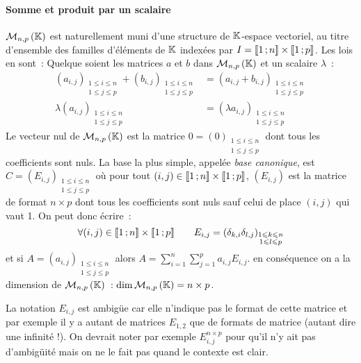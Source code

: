 \paragraph{Somme et produit par un scalaire}
$\mathcal{M}_{n,p}\left(\mathbb{K}\right)$ est naturellement muni d'une structure de $\mathbb{K}$-espace vectoriel, au titre d'ensemble des familles d'éléments de $\mathbb{K}$ indexées par $I = \mathopen{\llbracket}1\mathclose{}\mathpunct{};n\mathclose{\rrbracket} \times \mathopen{\llbracket}1\mathclose{}\mathpunct{};p\mathclose{\rrbracket}$. Les lois en sont~: Quelque soient les matrices $a$ et $b$ dans $\mathcal{M}_{n,p}\left(\mathbb{K}\right)$ et un scalaire $\lambda$~:
\begin{align}
	(a_{i,j})_{\substack{1\leqslant i \leqslant n \\ 1 \leqslant j \leqslant p}} + (b_{i,j})_{\substack{1\leqslant i \leqslant n \\ 1 \leqslant j \leqslant p}} & = (a_{i,j}+b_{i,j})_{\substack{1\leqslant i \leqslant n \\ 1 \leqslant j \leqslant p}} \\
	\lambda  (a_{i,j})_{\substack{1\leqslant i \leqslant n \\ 1 \leqslant j \leqslant p}} &= (\lambda a_{i,j})_{\substack{1\leqslant i \leqslant n \\ 1 \leqslant j \leqslant p}}
\end{align}
Le vecteur nul de $\mathcal{M}_{n,p}\left(\mathbb{K}\right)$ est la matrice $0 = (0)_{\substack{1\leqslant i \leqslant n \\ 1 \leqslant j \leqslant p}}$ dont tous les coefficients sont nuls. La base la plus simple, appelée \emph{base canonique}, est $C = (E_{i,j})_{\substack{1\leqslant i \leqslant n \\ 1 \leqslant j \leqslant p}}$ où pour tout $(i,j) \in \mathopen{\llbracket}1\mathclose{}\mathpunct{};n\mathclose{\rrbracket} \times \mathopen{\llbracket}1\mathclose{}\mathpunct{};p\mathclose{\rrbracket}$, $(E_{i,j})$ est la matrice de format $n \times p$ dont tous les coefficients sont nuls sauf celui de place $(i, j)$ qui vaut 1. On peut donc écrire~:
\begin{equation}
	\forall (i,j) \in \mathopen{\llbracket}1\mathclose{}\mathpunct{};n\mathclose{\rrbracket} \times \mathopen{\llbracket}1\mathclose{}\mathpunct{};p\mathclose{\rrbracket} \qquad E_{i,j} = (\delta_{k,i} \delta_{l,j})_{\substack{1\leqslant k \leqslant n \\ 1 \leqslant l \leqslant p}}
\end{equation}
et si $A = (a_{i,j})_{\substack{1\leqslant i \leqslant n \\ 1 \leqslant j \leqslant p}}$ alors $A = \sum_{i=1}^n \sum_{j=1}^p a_{i,j} E_{i,j}$. en conséquence on a la dimension de $\mathcal{M}_{n,p}\left(\mathbb{K}\right)$~: $\operatorname{dim}{\mathcal{M}_{n,p}\left(\mathbb{K}\right)} = n \times p$.
\begin{remarque}
	La notation $E_{i,j}$ est ambigüe car elle n'indique pas le format de cette matrice et par exemple il y a autant de matrices $E_{1,2}$ que de formats de matrice (autant dire une infinité !). On devrait noter par exemple $E_{i,j}^{n\times p}$ pour qu'il n'y ait pas d'ambigüité mais on ne le fait pas quand le contexte est clair.
\end{remarque}
